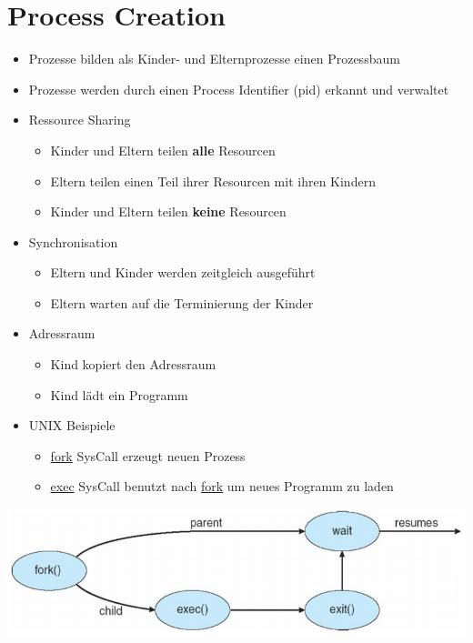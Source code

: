 \documentclass[a4paper]{scrreprt}
\begin{document}
\section{Process Creation}
	\begin{itemize}
		\item Prozesse bilden als Kinder- und Elternprozesse einen Prozessbaum
		\item Prozesse werden durch einen Process Identifier (pid) erkannt und verwaltet
		\item Ressource Sharing
		\begin{itemize}
			\item Kinder und Eltern teilen \textbf{alle} Resourcen
			\item Eltern teilen einen Teil ihrer Resourcen mit ihren Kindern
			\item Kinder und Eltern teilen \textbf{keine} Resourcen
		\end{itemize}
		\item Synchronisation
		\begin{itemize}
			\item Eltern und Kinder werden zeitgleich ausgeführt
			\item Eltern warten auf die Terminierung der Kinder
		\end{itemize}
		\item Adressraum
		\begin{itemize}
			\item Kind kopiert den Adressraum
			\item Kind lädt ein Programm
		\end{itemize}
		\item UNIX Beispiele
		\begin{itemize}
			\item \underline{fork} SysCall erzeugt neuen Prozess
			\item \underline{exec} SysCall benutzt nach \underline{fork} um neues Programm zu laden
		\end{itemize}
	\end{itemize}
	\includegraphics[scale = 0.6]{graphics/process_fork.png}
\end{document}
